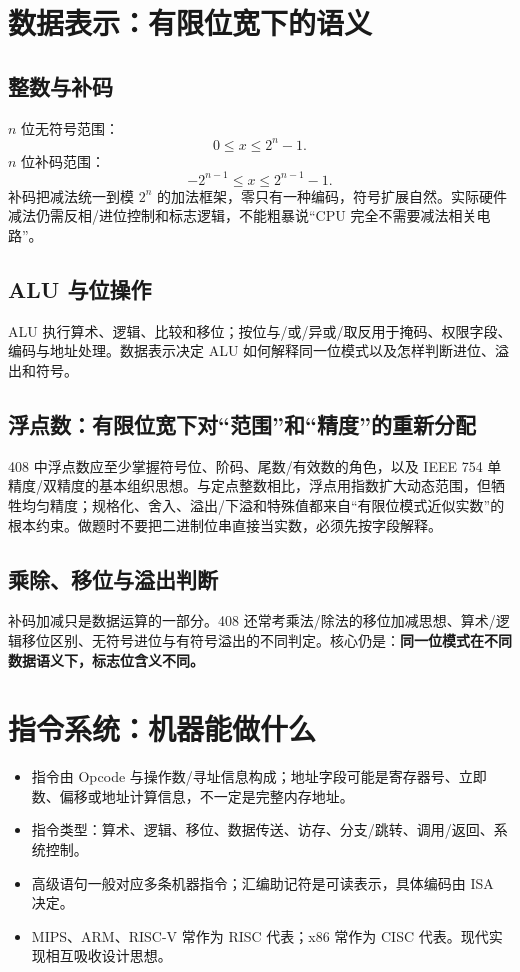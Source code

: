 \documentclass[11pt,a4paper,openany]{ctexbook}
\begin{document}
\section{数据表示：有限位宽下的语义}
\subsection{整数与补码}
$n$ 位无符号范围：
\[
0\le x\le 2^n-1.
\]
$n$ 位补码范围：
\[
-2^{n-1}\le x\le 2^{n-1}-1.
\]
补码把减法统一到模 $2^n$ 的加法框架，零只有一种编码，符号扩展自然。实际硬件减法仍需反相/进位控制和标志逻辑，不能粗暴说“CPU 完全不需要减法相关电路”。

\subsection{ALU 与位操作}
ALU 执行算术、逻辑、比较和移位；按位与/或/异或/取反用于掩码、权限字段、编码与地址处理。数据表示决定 ALU 如何解释同一位模式以及怎样判断进位、溢出和符号。


\subsection{浮点数：有限位宽下对“范围”和“精度”的重新分配}
408 中浮点数应至少掌握符号位、阶码、尾数/有效数的角色，以及 IEEE 754 单精度/双精度的基本组织思想。与定点整数相比，浮点用指数扩大动态范围，但牺牲均匀精度；规格化、舍入、溢出/下溢和特殊值都来自“有限位模式近似实数”的根本约束。做题时不要把二进制位串直接当实数，必须先按字段解释。

\subsection{乘除、移位与溢出判断}
补码加减只是数据运算的一部分。408 还常考乘法/除法的移位加减思想、算术/逻辑移位区别、无符号进位与有符号溢出的不同判定。核心仍是：\textbf{同一位模式在不同数据语义下，标志位含义不同。}

\section{指令系统：机器能做什么}
\begin{itemize}
  \item 指令由 Opcode 与操作数/寻址信息构成；地址字段可能是寄存器号、立即数、偏移或地址计算信息，不一定是完整内存地址。
  \item 指令类型：算术、逻辑、移位、数据传送、访存、分支/跳转、调用/返回、系统控制。
  \item 高级语句一般对应多条机器指令；汇编助记符是可读表示，具体编码由 ISA 决定。
  \item MIPS、ARM、RISC-V 常作为 RISC 代表；x86 常作为 CISC 代表。现代实现相互吸收设计思想。
\end{itemize}
\end{document}
